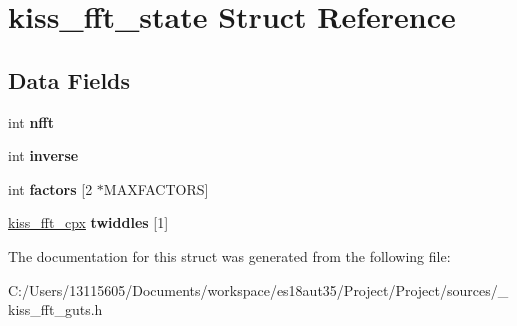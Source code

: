 \hypertarget{structkiss__fft__state}{}\section{kiss\+\_\+fft\+\_\+state Struct Reference}
\label{structkiss__fft__state}
\subsection*{Data Fields}
\begin{DoxyCompactItemize}
\item 
\hypertarget{structkiss__fft__state_aa7446bded329a40e13aef0826e349791}{}int {\bfseries nfft}\label{structkiss__fft__state_aa7446bded329a40e13aef0826e349791}

\item 
\hypertarget{structkiss__fft__state_a8faed935610ffb08bf7ad9ea8d6c81d2}{}int {\bfseries inverse}\label{structkiss__fft__state_a8faed935610ffb08bf7ad9ea8d6c81d2}

\item 
\hypertarget{structkiss__fft__state_a2d5d0897276dbac0674fae556f951d18}{}int {\bfseries factors} \mbox{[}2 $\ast$M\+A\+X\+F\+A\+C\+T\+O\+R\+S\mbox{]}\label{structkiss__fft__state_a2d5d0897276dbac0674fae556f951d18}

\item 
\hypertarget{structkiss__fft__state_aa7d1cab86ec03a8ecddfe0d91ef0bd20}{}\hyperlink{structkiss__fft__cpx}{kiss\+\_\+fft\+\_\+cpx} {\bfseries twiddles} \mbox{[}1\mbox{]}\label{structkiss__fft__state_aa7d1cab86ec03a8ecddfe0d91ef0bd20}

\end{DoxyCompactItemize}


The documentation for this struct was generated from the following file\+:\begin{DoxyCompactItemize}
\item 
C\+:/\+Users/13115605/\+Documents/workspace/es18aut35/\+Project/\+Project/sources/\+\_\+kiss\+\_\+fft\+\_\+guts.\+h\end{DoxyCompactItemize}
